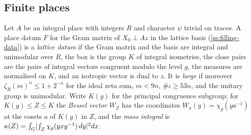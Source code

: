 \subsection{Finite places}\label{ss:finite-data}
Let $A$ be an integral place with integers $R$ and character $\psi$ trivial on traces. A place datum $F$ for the Gram matrix of $X_0\perp Az$ in the lattice basis (\cref{ss:filling-data}) is a \emph{lattice
datum} if the Gram matrix and the basis are integral and unimodular over $R$, the box is the group $K$ of integral isometries, the close pairs are the pairs of integral vectors congruent modulo the level $g$,
the measures are normalised on $K$, and an isotropic vector is dual to $z$. It is \emph{large} if moreover $\zeta_R(m)^n\le1+2^{-n}$ for the ideal zeta sum, $m<9n$, $\#\iota\ge53n$, and the unitary group is
unimodular. Write $K(g)$ for the principal congruence subgroup; for $K(g)\le Z\le K$ the \emph{Bessel vector} $W_Z$ has the coordinates $W_a(y)=\chi_g(ya^{-1})$ at the cosets $a$ of $K(g)$ in $Z$, and the
\emph{mass integral} is $\kappa(Z)=\int_G\lvert \int_Z\chi_g(yxy^{-1})\,dy\rvert^2dx$.
